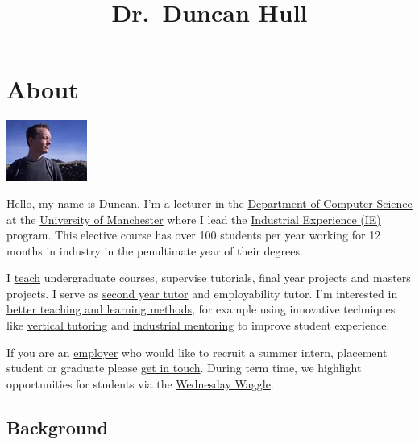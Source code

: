 \documentclass[12pt,]{book}
\title{Dr.~Duncan Hull}
\author{}
\date{}
\begin{document}
\maketitle

{
\setcounter{tocdepth}{1}
\tableofcontents
}
\hypertarget{about}{%
\chapter*{About}\label{about}}

\begin{center}\includegraphics[width=0.25\linewidth]{images/me-blue} \end{center}

Hello, my name is Duncan. I'm a lecturer in the \href{https://www.cs.manchester.ac.uk/}{Department of Computer Science} at the \href{https://www.manchester.ac.uk}{University of Manchester} where I lead the \href{https://www.cs.manchester.ac.uk/study/undergraduate/industrial-experience/}{Industrial Experience (IE)} program. This elective course has over 100 students per year working for 12 months in industry in the penultimate year of their degrees.

I \protect\hyperlink{teaching}{teach} undergraduate courses, supervise tutorials, final year projects and masters projects. I serve as \href{http://studentnet.cs.manchester.ac.uk/ugt/year2/}{second year tutor} and employability tutor. I'm interested in \protect\hyperlink{research}{better teaching and learning methods}, for example using innovative techniques like \protect\hyperlink{vertical-tutoring}{vertical tutoring} and \href{https://www.cs.manchester.ac.uk/connect/business-engagement/industrial-mentoring/}{industrial mentoring} to improve student experience.

If you are an \protect\hyperlink{employers}{employer} who would like to recruit a summer intern, placement student or graduate please \protect\hyperlink{contact}{get in touch}. During term time, we highlight opportunities for students via the \href{https://waggle.cs.manchester.ac.uk/waggle/about}{Wednesday Waggle}. 🐝

\hypertarget{background}{%
\section*{Background}\label{background}}
\end{document}

